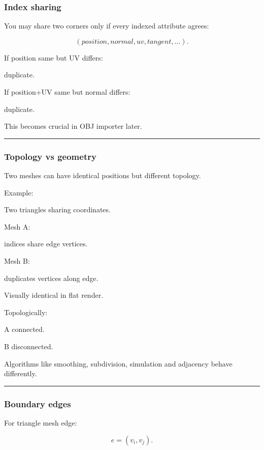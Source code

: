 \subsubsection{Index sharing}\label{index-sharing}

You may share two corners only if every indexed attribute agrees:

\[
(position,normal,uv,tangent,\ldots).
\]

If position same but UV differs:

duplicate.

If position+UV same but normal differs:

duplicate.

This becomes crucial in OBJ importer later.

\begin{center}\rule{0.5\linewidth}{0.5pt}\end{center}

\subsubsection{Topology vs geometry}\label{topology-vs-geometry}

Two meshes can have identical positions but different topology.

Example:

Two triangles sharing coordinates.

Mesh A:

indices share edge vertices.

Mesh B:

duplicates vertices along edge.

Visually identical in flat render.

Topologically:

A connected.

B disconnected.

Algorithms like smoothing, subdivision, simulation and adjacency behave differently.

\begin{center}\rule{0.5\linewidth}{0.5pt}\end{center}

\subsubsection{Boundary edges}\label{boundary-edges}

For triangle mesh edge:

\[
e=(v_i,v_j).
\]

